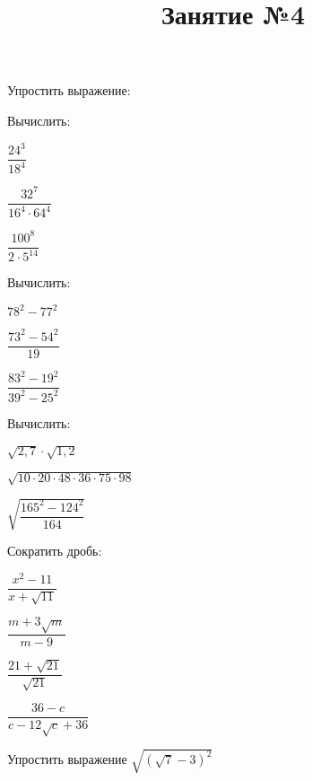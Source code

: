 \begin{listofex}
	\item Упростить выражение:
	\begin{enumcols}[itemcolumns=1]
		\item {}
		\item {}
	\end{enumcols}
	\item Вычислить:
	\begin{enumcols}[itemcolumns=3]
		\item \( \dfrac{24^3}{18^4} \)
		\item \( \dfrac{32^7}{16^4\cdot64^4} \)
		\item \( \dfrac{100^8}{2^{}\cdot5^{14}} \)
	\end{enumcols}
	\item Вычислить:
	\begin{enumcols}[itemcolumns=3]
		\item \( 78^2-77^2 \)
		\item \( \dfrac{73^2-54^2}{19} \)
		\item \( \dfrac{83^2-19^2}{39^2-25^2} \)
	\end{enumcols}
	\item Вычислить:
	\begin{enumcols}[itemcolumns=3]
		\item \( \sqrt{2,7}\cdot\sqrt{1,2} \)
		\item \( \sqrt{10\cdot20\cdot48\cdot36\cdot75\cdot98} \)
		\item \( \sqrt{\dfrac{165^2-124^2}{164}} \)
	\end{enumcols}
	\item Сократить дробь:
	\begin{enumcols}[itemcolumns=2]
		\item \( \dfrac{x^2-11}{x+\sqrt{11}} \)
		\item \( \dfrac{m+3\sqrt{m}}{m-9} \)
		\item \( \dfrac{21+\sqrt{21}}{\sqrt{21}} \)
		\item \( \dfrac{36-c}{c-12\sqrt{c}+36} \)
	\end{enumcols}
	\item Упростить выражение \( \sqrt{(\sqrt{7}-3)^2} \)
\end{listofex}
\newpage
\title{Занятие №4}
